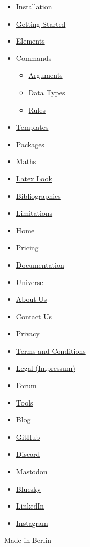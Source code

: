 \begin{itemize}
\tightlist
\item
  \hyperref[installation]{Installation}
\item
  \hyperref[getting-started]{Getting Started}
\item
  \hyperref[elements]{Elements}
\item
  \hyperref[commands]{Commands}

  \begin{itemize}
  \tightlist
  \item
    \hyperref[arguments]{Arguments}
  \item
    \hyperref[data-types]{Data Types}
  \item
    \hyperref[rules]{Rules}
  \end{itemize}
\item
  \hyperref[templates]{Templates}
\item
  \hyperref[packages]{Packages}
\item
  \hyperref[maths]{Maths}
\item
  \hyperref[latex-look]{Latex Look}
\item
  \hyperref[bibliographies]{Bibliographies}
\item
  \hyperref[limitations]{Limitations}
\end{itemize}

\begin{itemize}
\tightlist
\item
  \href{/}{Home}
\item
  \href{/pricing/}{Pricing}
\item
  \href{/docs/}{Documentation}
\item
  \href{/universe/}{Universe}
\item
  \href{/about/}{About Us}
\item
  \href{/contact/}{Contact Us}
\item
  \href{/privacy/}{Privacy}
\item
  \href{https://typst.app/terms}{Terms and Conditions}
\item
  \href{/legal/}{Legal (Impressum)}
\end{itemize}

\begin{itemize}
\tightlist
\item
  \href{https://forum.typst.app}{Forum}
\item
  \href{/tools/}{Tools}
\item
  \href{/blog/}{Blog}
\item
  \href{https://github.com/typst/}{GitHub}
\item
  \href{https://discord.gg/2uDybryKPe}{Discord}
\item
  \href{https://mastodon.social/@typst}{Mastodon}
\item
  \href{https://bsky.app/profile/typst.app}{Bluesky}
\item
  \href{https://www.linkedin.com/company/typst/}{LinkedIn}
\item
  \href{https://instagram.com/typstapp/}{Instagram}
\end{itemize}

Made in Berlin
